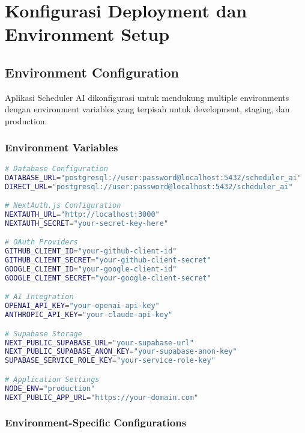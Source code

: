 \section{Konfigurasi Deployment dan Environment Setup}

\subsection{Environment Configuration}

Aplikasi Scheduler AI dikonfigurasi untuk mendukung multiple environments dengan environment variables yang terpisah untuk development, staging, dan production.

\subsubsection{Environment Variables}

\begin{lstlisting}[language=bash, caption=Environment Variables Configuration]
# Database Configuration
DATABASE_URL="postgresql://user:password@localhost:5432/scheduler_ai"
DIRECT_URL="postgresql://user:password@localhost:5432/scheduler_ai"

# NextAuth.js Configuration
NEXTAUTH_URL="http://localhost:3000"
NEXTAUTH_SECRET="your-secret-key-here"

# OAuth Providers
GITHUB_CLIENT_ID="your-github-client-id"
GITHUB_CLIENT_SECRET="your-github-client-secret"
GOOGLE_CLIENT_ID="your-google-client-id"
GOOGLE_CLIENT_SECRET="your-google-client-secret"

# AI Integration
OPENAI_API_KEY="your-openai-api-key"
ANTHROPIC_API_KEY="your-claude-api-key"

# Supabase Storage
NEXT_PUBLIC_SUPABASE_URL="your-supabase-url"
NEXT_PUBLIC_SUPABASE_ANON_KEY="your-supabase-anon-key"
SUPABASE_SERVICE_ROLE_KEY="your-service-role-key"

# Application Settings
NODE_ENV="production"
NEXT_PUBLIC_APP_URL="https://your-domain.com"
\end{lstlisting}

\subsubsection{Environment-Specific Configurations}

